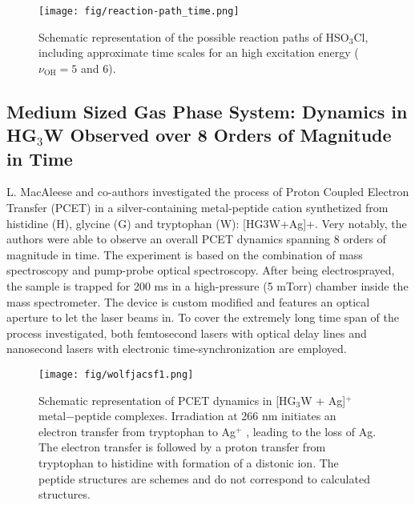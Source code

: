 \documentclass[journal=jacsat,manuscript=article]{achemso}
\begin{document}
\begin{figure}
\texttt{[image: fig/reaction-path\_time.png]}
\caption{Schematic representation of the possible reaction paths of
  HSO$_3$Cl, including approximate time scales for an high excitation
  energy ($\nu_{\text{OH}} = 5$ and 6).}
\label{fig:vibphotodis}
\end{figure} 
    

\subsection{Medium Sized Gas Phase System: Dynamics in HG$_3$W Observed over 8 Orders of Magnitude in Time}
L. MacAleese and co-authors investigated the process of Proton Coupled
Electron Transfer (PCET) in a silver-containing metal-peptide cation
synthetized from histidine (H), glycine (G) and tryptophan (W):
[HG3W+Ag]+. Very notably, the authors were able to observe an overall
PCET dynamics spanning 8 orders of magnitude in time.  The experiment
is based on the combination of mass spectroscopy and pump-probe
optical spectroscopy. After being electrosprayed, the sample is
trapped for 200 ms in a high-pressure (5 mTorr) chamber inside the
mass spectrometer. The device is custom modified and features an
optical aperture to let the laser beams in.  To cover the extremely
long time span of the process investigated, both femtosecond lasers
with optical delay lines and nanosecond lasers with electronic
time-synchronization are employed.



\begin{figure}[h]
\centering
\texttt{[image: fig/wolfjacsf1.png]}
\caption{Schematic representation of PCET dynamics in [HG$_3$W +
    Ag]$^+$ metal−peptide complexes. Irradiation at 266 nm initiates
  an electron transfer from tryptophan to Ag$^+$ , leading to the loss
  of Ag.  The electron transfer is followed by a proton transfer from
  tryptophan to histidine with formation of a distonic ion. The
  peptide structures are schemes and do not correspond to calculated
  structures.}
\label{fig:fig1jacs}
\end{figure}
\end{document}
